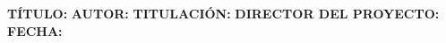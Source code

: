 \textbf{TÍTULO:} \TituloCaps{}
\newline
\newline
\newline
\textbf{AUTOR:} \NombreAutorCaps{}
\newline
\newline
\newline
\textbf{TITULACIÓN:} \Titulacion{}
\newline
\newline
\newline
\textbf{DIRECTOR DEL PROYECTO:}  \NombreTutor{}
\newline
\newline
\newline
\textbf{FECHA:} \Fecha{}